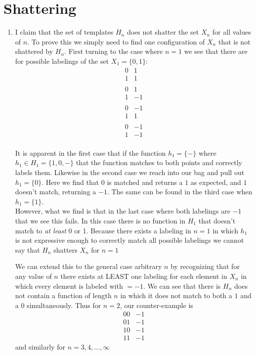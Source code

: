 \documentclass[11pt,a4paper]{article}
\begin{document}
	\section{Shattering}
		\begin{enumerate}
			\item I claim that the set of templates $H_n$ does not shatter the set $X_n$ for all values of $n$. To prove this we simply need to find one configuration of $X_n$ that is not shattered by $H_n$. First turning to the case where $n=1$ we see that there are for possible labelings of the set $X_1=\{0,1\}$:
			$$\begin{array}{c|c} 
				0  & 1  \\
				1  & 1  \\ 
				   &    \\
				0  &  1 \\
				1  & -1 \\
				   &    \\
				0  & -1 \\
				1  &  1 \\
				   &    \\
				0  & -1 \\
				1  & -1 \\
			\end{array}$$
			
			It is apparent in the first case that if the function $h_1 = \{-\}$ where $h_1 \in H_1 = \{1,0,-\}$ that the function matches to both points and correctly labels them. Likewise in the second case we reach into our bag and pull out $h_1 = \{0\}$. Here we find that $0$ is matched and returns a $1$ as expected, and $1$ doesn't match, returning a $-1$. The same can be found in the third case when $h_1=\{ 1\}$.\\
			
			However, what we find is that in the last case where both labelings are $-1$ that we see this fails. In this case there is no function in $H_1$ that doesn't match to \textit{at least} 0 or 1. Because there exists a labeling in $n=1$ in which $h_1$ is not expressive enough to correctly match all possible labelings we cannot say that $H_n$ shatters $X_n$ for $n=1$
			
			We can extend this to the general case arbitrary $n$ by recognizing that for any value of $n$ there exists at LEAST one labeling for each element in $X_n$ in which every element is labeled with $=-1$. We can see that there is $H_n$ does not contain a function of length $n$ in which it does not match to both a $1$ and a $0$ simultaneously. Thus for $n=2$, our counter-example is $$\begin{array}{c|c} 
				00  & -1 \\
				01  & -1 \\
				10  & -1 \\
				11  & -1
			\end{array}$$
			and similarly for $n=3,4,\dots,\infty$
		\end{enumerate}
	
\end{document}
